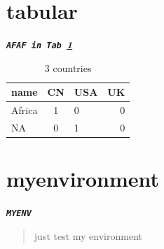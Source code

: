 \documentclass[12pt]{article} %
\newcommand{\myfont}[1]{\texttt{\textbf{\textit{#1}}}}
\newenvironment{myenv}{
\begin{center}\huge\myfont{MYENV}\end{center}
\begin{quote}\par
}{
\end{quote}
}
\begin{document}
    \section{tabular}
    \myfont{AFAF in Tab \ref{Tab3k}}
    \begin{table}[H]
        \centering
        \caption{\small 3 countries} \label{Tab3k}
        \begin{tabular}{l|c|p{5cm} r}
            \hline
            name & CN & USA & UK \\
            \hline
            Africa & 1 & 0 & 0 \\
            \hline
            NA & 0 & 1 & 0\\
            \hline
            \end{tabular}
    \end{table}

    \section{myenvironment}
    \begin{myenv}
        just test my environment
    \end{myenv}

    
\end{document}
